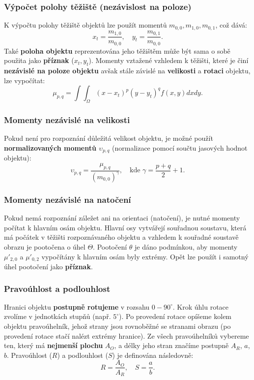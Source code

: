 \subsubsection*{Výpočet polohy těžiště (nezávislost na poloze)}
K výpočtu polohy těžiště objektů lze použít momentů $m_{0,0}, m_{1,0}, m_{0,1}$, což dává:
\begin{equation*}
x_t = \frac{m_{1,0}}{m_{0,0}}, \quad y_t = \frac{m_{0,1}}{m_{0,0}}.
\end{equation*}
Také \textbf{poloha objektu} reprezentována jeho těžištěm může být sama o sobě použita jako \textbf{příznak} ($x_t, y_t$). Momenty vztažené vzhledem k těžišti, které je činí \textbf{nezávislé na poloze objektu} avšak stále závislé na \textbf{velikosti} a \textbf{rotaci} objektu, lze vypočítat:
\begin{equation*}
\mu_{p, q} = \int{}\int_\Omega (x - x_t)^p (y - y_t)^q f(x, y)dx dy.
\end{equation*}

\subsubsection*{Momenty nezávislé na velikosti}
Pokud není pro rozpoznání důležitá velikost objektu, je možné použít \textbf{normalizovaných momentů $\upsilon_{p, q}$} (normalizace pomocí součtu jasových hodnot objektu):
\begin{equation*}
\upsilon_{p, q} = \frac{\mu_{p, q}}{(m_{0, 0})^\gamma}, \quad \textrm{kde } \gamma = \frac{p + q}{2} + 1.
\end{equation*}

\subsubsection*{Momenty nezávislé na natočení}
Pokud nemá rozpoznání záležet ani na orientaci (natočení), je nutné momenty počítat k hlavním osám objektu. Hlavní osy vytvářejí souřadnou soustavu, která má počátek v těžišti rozpoznávaného objektu a vzhledem k souřadné soustavě obrazu je pootočena o úhel $\Theta$. Pootočení $\theta$ je dáno podmínkou, aby momenty $\mu'_{2, 0}$ a $ \mu'_{0, 2}$ vypočítány k hlavním osám byly extrémy. Opět lze použít i samotný úhel pootočení jako \textbf{příznak}.

\subsubsection{Pravoúhlost a podlouhlost}
Hranici objektu \textbf{postupně rotujeme} v rozsahu $0 - 90^\circ$. Krok úhlu rotace zvolíme v jednotkách stupňů (např. $5^\circ$). Po provedení rotace opíšeme kolem objektu pravoúhelník, jehož strany jsou rovnoběžné se stranami obrazu (po provedení rotace stačí nalézt extrémy hranice). Ze všech pravoúhelníků vybereme ten, který má \textbf{nejmenší plochu} $A_O$, a délky jeho stran značíme postupně $A_R$, $a$, $b$. Pravoúhlost ($R$) a podlouhlost ($S$) je definována následovně:
\begin{equation*}
R = \frac{A_O}{A_R}, \quad S = \frac{a}{b}.
\end{equation*}

